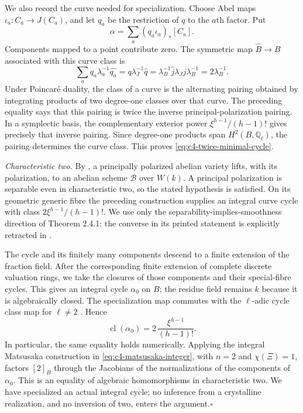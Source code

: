 We also record the curve needed for specialization. Choose Abel maps
$\iota_a:C_a\to J(C_a)$, and let $q_a$ be the restriction of $q$ to
the $a$th factor. Put
\[
                 \alpha=\sum_a(q_a\iota_a)_*[C_a].
\]
Components mapped to a point contribute zero. The symmetric map
$\widehat B\to B$ associated with this curve class is
\[
 \sum_aq_a\lambda_a^{-1}\widehat{q_a}
   =q\lambda_J^{-1}\widehat q
   =\lambda_B^{-1}\widehat j\lambda_Jj\lambda_B^{-1}
   =2\lambda_B^{-1}.
\]
Under Poincar\'e duality, the class of a curve is the alternating
pairing obtained by integrating products of two degree-one classes
over that curve. The preceding equality says that this pairing is
twice the inverse principal-polarization pairing. In a symplectic
basis, the complementary exterior power
$\xi^{h-1}/(h-1)!$ gives precisely that inverse pairing.
Since degree-one products span $H^2(B,\mathbb Q_\ell)$, the pairing
determines the curve class. This proves
\eqref{eq:c4-twice-minimal-cycle}.

\emph{Characteristic two.}
By \citet[Theorem 2.4.1, p.~286, and Corollary 2.4.2 with its proof,
p.~287]{frC4Oort1971}, a principally polarized abelian variety lifts,
with its polarization, to an abelian scheme $\mathcal B$ over
$W(k)$. A principal polarization is separable even in characteristic
two, so the stated hypothesis is satisfied. On its geometric generic
fibre the preceding construction supplies an integral curve cycle
with class $2\xi^{h-1}/(h-1)!$.
We use only the separability-implies-smoothness direction of
Theorem 2.4.1: the converse in its printed statement is explicitly
retracted in \citet[p.~3 of the opened preprint]{cyOortUeno1973}.

The cycle and its finitely many components descend to a finite
extension of the fraction field. After the corresponding finite
extension of complete discrete valuation rings, we take the closures
of those components and their special-fibre cycles. This gives an
integral cycle $\alpha_0$ on $B$; the residue field remains $k$ because
it is algebraically closed. The specialization map commutes with
the $\ell$-adic cycle class map for $\ell\ne2$
\citep[Proposition 20.3, p.~399, and Example 20.3.5,
p.~400]{frC4Fulton1998}. Hence
\[
                 \operatorname{cl}(\alpha_0)
                    =2\,\frac{\xi^{h-1}}{(h-1)!}.
\]
In particular, the same equality holds numerically. Applying the
integral Matsusaka construction in
\eqref{eq:c4-matsusaka-integer}, with $n=2$ and $\chi(\Xi)=1$,
factors $[2]_B$ through the Jacobians of the normalizations of the
components of $\alpha_0$. This is an equality of algebraic
homomorphisms in characteristic two. We have specialized an actual
integral cycle; no inference from a crystalline realization, and
no inversion of two, enters the argument.\hfill$\square$


